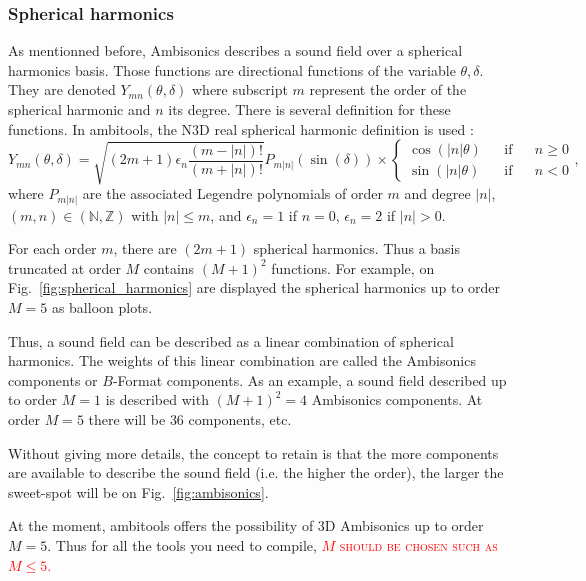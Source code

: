 \documentclass[10pt,a4paper]{article}
\begin{document}
\subsubsection{Spherical harmonics}
As mentionned before, Ambisonics describes a sound field over a spherical harmonics basis. Those functions are directional functions of the variable $\theta,\delta$. They are denoted $Y_{mn}(\theta,\delta)$ where subscript $m$ represent the order of the spherical harmonic and $n$ its degree. There is several definition for these functions. In ambitools, the N3D real spherical harmonic definition is used \cite{daniel2000representation}:
\begin{equation}
Y_{mn}(\theta,\delta) = \sqrt{(2m+1)\epsilon_n \frac{(m-|n|)!}{(m+|n|)!}} P_{m|n|}(\sin(\delta))
 \times \left\lbrace \begin{aligned} \cos(|n| \theta) & & \text{if} & & n \geq 0 \\ \sin(|n| \theta)  & & \text{if} & & n < 0  \end{aligned} \right.,
\label{eq:ymn}
\end{equation}
where $P_{m|n|}$ are the associated Legendre polynomials of order $m$ and degree $|n|$, $(m,n) \in (\mathbb{N},\mathbb{Z})$ with $|n| \leq m$, and $\epsilon_n = 1$ if $n = 0$, $\epsilon_n = 2$ if $|n| > 0$.

For each order $m$, there are $(2 m +1)$ spherical harmonics. Thus a basis truncated at order $M$ contains $(M+1)^2$ functions. For example, on Fig.~\ref{fig:spherical_harmonics} are displayed the spherical harmonics up to order $M=5$ as balloon plots.

Thus, a sound field can be described as a linear combination of spherical harmonics. The weights of this linear combination are called the Ambisonics components or $B$-Format components. As an example, a sound field described up to order $M=1$ is described with $(M+1)^2=4$ Ambisonics components. At order $M=5$ there will be $36$ components, etc.

Without giving more details, the concept to retain is that the more components are available to describe the sound field (i.e. the higher the order), the larger the sweet-spot will be on Fig.~\ref{fig:ambisonics}.

At the moment, ambitools offers the possibility of 3D Ambisonics up to order $M=5$. Thus for all the tools you need to compile, \textcolor{red}{\textsc{$M$ should be chosen such as $M \leq 5$.}}
\end{document}
